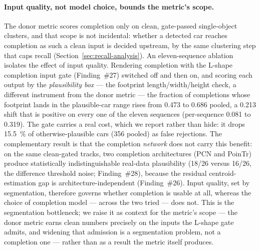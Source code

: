 \paragraph{Input quality, not model choice, bounds the metric's scope.}
The donor metric scores completion only on clean, gate-passed single-object clusters, and
that scope is not incidental: whether a detected car reaches completion as such a clean
input is decided upstream, by the same clustering step that caps recall
(Section~\ref{sec:recall-analysis}). An eleven-sequence ablation isolates the effect of
input quality. Rendering completion with the L-shape completion input gate (Finding~\#27)
switched off and then on, and scoring each output by the \emph{plausibility box} --- the
footprint length/width/height check, a different instrument from the donor metric --- the
fraction of completions whose footprint lands in the plausible-car range rises from
\num{0.473} to \num{0.686} pooled, a \num{+0.213} shift that is positive on every one of
the eleven sequences (per-sequence \num{+0.081} to \num{+0.319}). The gate carries a real
cost, which we report rather than hide: it drops \SI{15.5}{\percent} of otherwise-plausible
cars (\num{356} pooled) as false rejections. The complementary result is that the
completion \emph{network} does not carry this benefit: on the same clean-gated tracks, two
completion architectures (PCN and PoinTr) produce statistically indistinguishable real-data
plausibility (\num{18}/\num{26} versus \num{16}/\num{26}, the difference threshold noise;
Finding~\#28), because the residual centroid-estimation gap is architecture-independent
(Finding~\#26). Input quality, set by segmentation, therefore governs whether completion is
usable at all, whereas the choice of completion model --- across the two tried --- does
not. This is the segmentation bottleneck; we raise it as context for the metric's scope ---
the donor metric earns clean numbers precisely on the inputs the L-shape gate admits, and
widening that admission is a segmentation problem, not a completion one --- rather than as a
result the metric itself produces.


